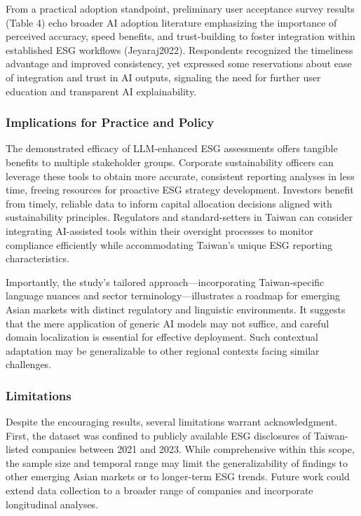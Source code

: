 \documentclass[
  12pt,
]{article}
\begin{document}
From a practical adoption standpoint, preliminary user acceptance survey
results (Table 4) echo broader AI adoption literature emphasizing the
importance of perceived accuracy, speed benefits, and trust-building to
foster integration within established ESG workflows (Jeyaraj2022).
Respondents recognized the timeliness advantage and improved
consistency, yet expressed some reservations about ease of integration
and trust in AI outputs, signaling the need for further user education
and transparent AI explainability.

\subsubsection{Implications for Practice and
Policy}\label{implications-for-practice-and-policy}

The demonstrated efficacy of LLM-enhanced ESG assessments offers
tangible benefits to multiple stakeholder groups. Corporate
sustainability officers can leverage these tools to obtain more
accurate, consistent reporting analyses in less time, freeing resources
for proactive ESG strategy development. Investors benefit from timely,
reliable data to inform capital allocation decisions aligned with
sustainability principles. Regulators and standard-setters in Taiwan can
consider integrating AI-assisted tools within their oversight processes
to monitor compliance efficiently while accommodating Taiwan's unique
ESG reporting characteristics.

Importantly, the study's tailored approach---incorporating
Taiwan-specific language nuances and sector terminology---illustrates a
roadmap for emerging Asian markets with distinct regulatory and
linguistic environments. It suggests that the mere application of
generic AI models may not suffice, and careful domain localization is
essential for effective deployment. Such contextual adaptation may be
generalizable to other regional contexts facing similar challenges.

\subsubsection{Limitations}\label{limitations}

Despite the encouraging results, several limitations warrant
acknowledgment. First, the dataset was confined to publicly available
ESG disclosures of Taiwan-listed companies between 2021 and 2023. While
comprehensive within this scope, the sample size and temporal range may
limit the generalizability of findings to other emerging Asian markets
or to longer-term ESG trends. Future work could extend data collection
to a broader range of companies and incorporate longitudinal analyses.
\end{document}
